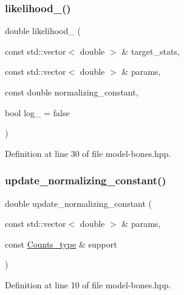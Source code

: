 \mbox{\label{model-bones_8hpp_a30867af87b732210c25b5148a8909454}} 
\subsubsection{\texorpdfstring{likelihood\+\_\+()}{likelihood\_()}}
{\footnotesize\ttfamily double likelihood\+\_\+ (\begin{DoxyParamCaption}\item[{const std\+::vector$<$ double $>$ \&}]{target\+\_\+stats,  }\item[{const std\+::vector$<$ double $>$ \&}]{params,  }\item[{const double}]{normalizing\+\_\+constant,  }\item[{bool}]{log\+\_\+ = {\ttfamily false} }\end{DoxyParamCaption})\hspace{0.3cm}{\ttfamily [inline]}}



Definition at line 30 of file model-\/bones.\+hpp.

\mbox{\label{model-bones_8hpp_a557368a4713ccf9ee1867c1bd17d58ba}} 
\subsubsection{\texorpdfstring{update\+\_\+normalizing\+\_\+constant()}{update\_normalizing\_constant()}}
{\footnotesize\ttfamily double update\+\_\+normalizing\+\_\+constant (\begin{DoxyParamCaption}\item[{const std\+::vector$<$ double $>$ \&}]{params,  }\item[{const \hyperlink{typedefs_8hpp_aee40fa17c1fddb63dd1f2b1470ade95b}{Counts\+\_\+type} \&}]{support }\end{DoxyParamCaption})\hspace{0.3cm}{\ttfamily [inline]}}



Definition at line 10 of file model-\/bones.\+hpp.


